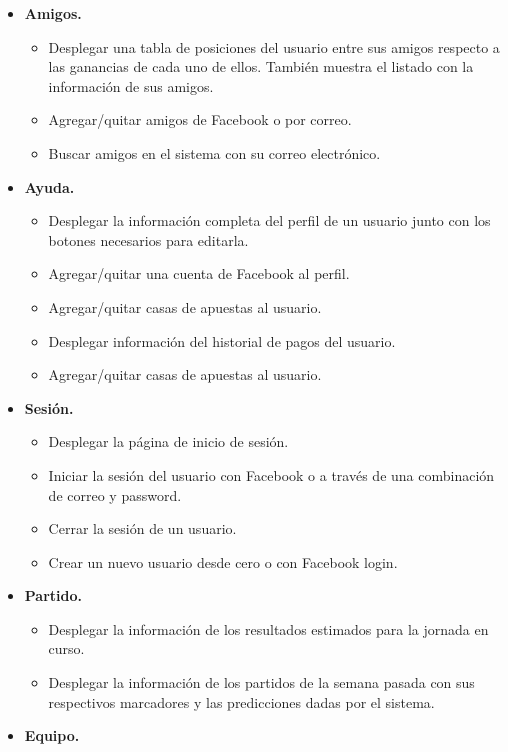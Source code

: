 \begin{itemize}
\begin{itemize}
			\end{itemize}
			\item \textbf{Amigos.}
			\begin{itemize}
				\item Desplegar una tabla de posiciones del usuario entre sus amigos respecto a las ganancias de cada uno de ellos. También muestra el listado con la información de sus amigos.
				\item Agregar/quitar amigos de Facebook o por correo.
				\item Buscar amigos en el sistema con su correo electrónico.
			\end{itemize}
			\item \textbf{Ayuda.}
			\begin{itemize}
				\item Desplegar la información completa del perfil de un usuario junto con los botones necesarios para editarla.
				\item Agregar/quitar una cuenta de Facebook al perfil.
				\item Agregar/quitar casas de apuestas al usuario.
 				\item Desplegar información del historial de pagos del usuario.
				\item Agregar/quitar casas de apuestas al usuario.
			\end{itemize}
			\item \textbf{Sesión.}
			\begin{itemize}
				\item Desplegar la página de inicio de sesión.
				\item Iniciar la sesión del usuario con Facebook o a través de una combinación de correo y password.
				\item Cerrar la sesión de un usuario.
 				\item Crear un nuevo usuario desde cero o con Facebook login.
			\end{itemize}
			\item \textbf{Partido.}
			\begin{itemize}
				\item Desplegar la información de los resultados estimados para la jornada en curso.
				\item Desplegar la información de los partidos de la semana pasada con sus respectivos marcadores y las predicciones dadas por el sistema.
			\end{itemize}
			\item \textbf{Equipo.}
			\begin{itemize}

\end{itemize}
\end{itemize}
